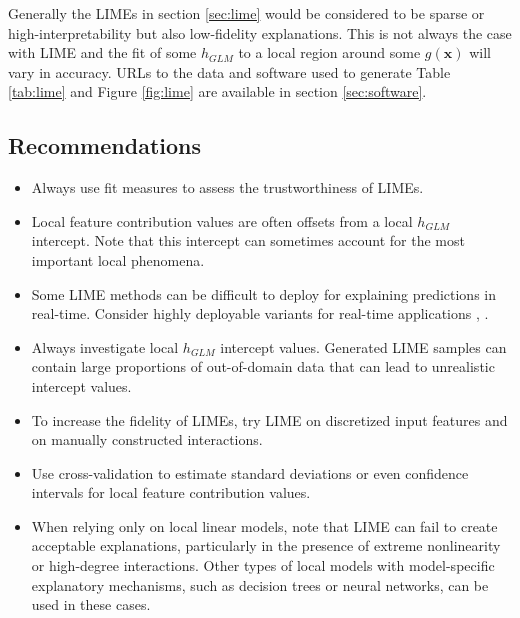\documentclass[11pt]{asaproc}
\begin{document}
Generally the LIMEs in section \ref{sec:lime} would be considered to be sparse or high-interpretability but also low-fidelity explanations. This is not always the case with LIME and the fit of some $h_{GLM}$ to a local region around some $g(\mathbf{x})$ will vary in accuracy. URLs to the data and software used to generate Table \ref{tab:lime} and Figure \ref{fig:lime} are available in section \ref{sec:software}.

\subsection{Recommendations}

\begin{itemize}
	
	\item Always use fit measures to assess the trustworthiness of LIMEs.

	\item Local feature contribution values are often offsets from a local $h_{GLM}$ intercept. Note that this intercept can sometimes account for the most important local phenomena.

	\item Some LIME methods can be difficult to deploy for explaining predictions in real-time. Consider highly deployable variants for real-time applications \cite{h2o_mli_booklet}, \cite{lime-sup}.
		
	\item Always investigate local $h_{GLM}$ intercept values. Generated LIME samples can contain large proportions of out-of-domain data that can lead to unrealistic intercept values. 
		
	\item To increase the fidelity of LIMEs, try LIME on discretized input features and on manually constructed interactions.
	
	\item Use cross-validation to estimate standard deviations or even confidence intervals for local feature contribution values.
	
	\item When relying only on local linear models, note that LIME can fail to create acceptable explanations, particularly in the presence of extreme nonlinearity or high-degree interactions. Other types of local models with model-specific explanatory mechanisms, such as decision trees or neural networks, can be used in these cases. 
	
\end{itemize}
\end{document}
